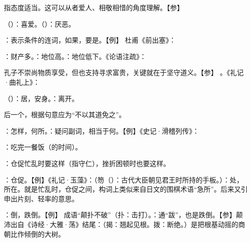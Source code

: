 {
\item {}指态度适当。这可以从者爱人、相敬相惜的角度理解。【参】 
\item {}（）：喜爱。（）：厌恶。
}
{}


{
\item {}：表示条件的连词，如果，要是。【例】 杜甫《前出塞》：
}
{}


{
\item {}：财产多。：地位高。：地位低下。《论语注疏》：

孔子不崇尚物质享受，但也支持寻求富贵，关键就在于坚守道义。【参】  。《礼记·曲礼上》：
\item {}（）：居，安身。：离开。
\item 后一个，根据句意应为“不以其道免之”。
\item {}：怎样，何所。：疑问副词，相当于何。【例】《史记·滑稽列传》：
\item {}：吃完一餐饭（的时间）。
\item {}：仓促忙乱时要这样（指守仁），挫折困顿时也要这样。

：仓促。【例】《礼记·玉藻》：（笏（）：古代大臣朝见君王时所持的手板。）：处，所在。就是忙乱时，仓促之间，构词上类似来自日文的围棋术语“急所”。后来又引申出片刻、轻率的意思。

：倒，跌倒。【例】 成语“颠扑不破”（扑：击打）。：通“跋”，也是跌倒。【参】颠沛出自《诗经·大雅·荡》结尾：（揭：翘起见根。拨：断绝。）是把根基动摇的商朝比作倾倒的大树。
}  %
{}


